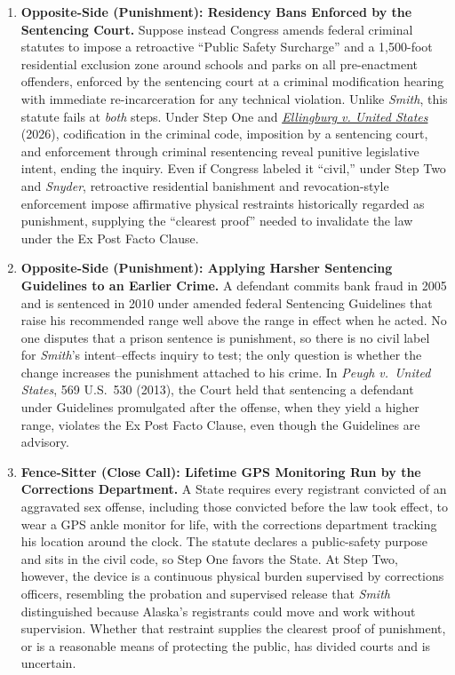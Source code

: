 \documentclass[12pt]{article}
\begin{document}
\begin{enumerate}
\item \textbf{Opposite-Side (Punishment): Residency Bans Enforced by the Sentencing Court.} Suppose instead Congress amends federal criminal statutes to impose a retroactive ``Public Safety Surcharge'' and a 1,500-foot residential exclusion zone around schools and parks on all pre-enactment offenders, enforced by the sentencing court at a criminal modification hearing with immediate re-incarceration for any technical violation. Unlike \textit{Smith}, this statute fails at \textit{both} steps. Under Step One and \href{https://www.law.cornell.edu/supremecourt/text/24-482}{\textit{Ellingburg v. United States}} (2026), codification in the criminal code, imposition by a sentencing court, and enforcement through criminal resentencing reveal punitive legislative intent, ending the inquiry. Even if Congress labeled it ``civil,'' under Step Two and \textit{Snyder}, retroactive residential banishment and revocation-style enforcement impose affirmative physical restraints historically regarded as punishment, supplying the ``clearest proof'' needed to invalidate the law under the Ex Post Facto Clause.

\item \textbf{Opposite-Side (Punishment): Applying Harsher Sentencing Guidelines to an Earlier Crime.} A defendant commits bank fraud in 2005 and is sentenced in 2010 under amended federal Sentencing Guidelines that raise his recommended range well above the range in effect when he acted. No one disputes that a prison sentence is punishment, so there is no civil label for \textit{Smith}'s intent--effects inquiry to test; the only question is whether the change increases the punishment attached to his crime. In \textit{Peugh v.\ United States}, 569 U.S.\ 530 (2013), the Court held that sentencing a defendant under Guidelines promulgated after the offense, when they yield a higher range, violates the Ex Post Facto Clause, even though the Guidelines are advisory.

\item \textbf{Fence-Sitter (Close Call): Lifetime GPS Monitoring Run by the Corrections Department.} A State requires every registrant convicted of an aggravated sex offense, including those convicted before the law took effect, to wear a GPS ankle monitor for life, with the corrections department tracking his location around the clock. The statute declares a public-safety purpose and sits in the civil code, so Step One favors the State. At Step Two, however, the device is a continuous physical burden supervised by corrections officers, resembling the probation and supervised release that \textit{Smith} distinguished because Alaska's registrants could move and work without supervision. Whether that restraint supplies the clearest proof of punishment, or is a reasonable means of protecting the public, has divided courts and is uncertain.

\end{enumerate}
\end{document}
